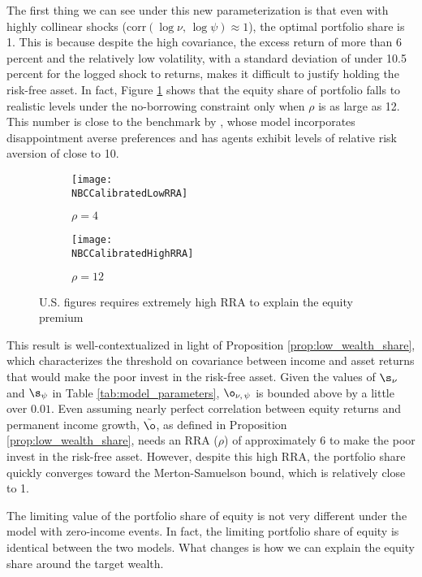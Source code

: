 The first thing we can see under this new parameterization is that even with highly collinear shocks ($\text{corr}(\log\nu,\,\log\psi) \approx 1$), the optimal portfolio share is 1. This is because despite the high covariance, the excess return of more than 6 percent and the relatively low volatility, with a standard deviation of under 10.5 percent for the logged shock to returns, makes it difficult to justify holding the risk-free asset. In fact, Figure \ref{fig:US_rho_comparison} shows that the equity share of portfolio falls to realistic levels under the no-borrowing constraint only when $\rho$ is as large as 12. This number is close to the benchmark by \citet{Schreindorfer2020}, whose model incorporates disappointment averse preferences and has agents exhibit levels of relative risk aversion of close to 10.

\begin{figure}[h]
    \centering
    \begin{subfigure}{0.49\textwidth}
        \centering
        \texttt{[image: \\NBCCalibratedLowRRA]}
        \caption{$\rho = 4$}
    \end{subfigure}
    \begin{subfigure}{0.49\textwidth}
        \centering
        \texttt{[image: \\NBCCalibratedHighRRA]}
        \caption{$\rho = 12$}
    \end{subfigure}
    \caption{U.S. figures requires extremely high RRA to explain the equity premium}
    \label{fig:US_rho_comparison}
\end{figure}

This result is well-contextualized in light of Proposition \ref{prop:low_wealth_share}, which characterizes the threshold on covariance between income and asset returns that would make the poor invest in the risk-free asset. Given the values of $\s_{\nu}$ and $\s_{\psi}$ in Table \ref{tab:model_parameters}, $\o_{\nu,\,\psi}$ is bounded above by a little over $0.01$. Even assuming nearly perfect correlation between equity returns and permanent income growth, $\tilde{\o}$, as defined in Proposition \ref{prop:low_wealth_share}, needs an RRA ($\rho$) of approximately 6 to make the poor invest in the risk-free asset. However, despite this high RRA, the portfolio share quickly converges toward the Merton-Samuelson bound, which is relatively close to 1.

The limiting value of the portfolio share of equity is not very different under the model with zero-income events. In fact, the limiting portfolio share of equity is identical between the two models. What changes is how we can explain the equity share around the target wealth.

